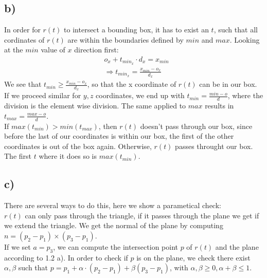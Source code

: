 \documentclass[a4paper]{scrartcl}
\begin{document}
    \subsection*{b)}
        In order for $r(t)$ to intersect a bounding box, it has to exist an $t$,
        such that all cordinates of $r(t)$ are within the boundaries defined by
        $min$ and $max$. Looking at the $min$ value of $x$ direction first:\\
        \begin{align*}
            & o_x + t_{min_x} \cdot d_x = x_{min}\\
            &\Rightarrow t_{min_x}=\frac{x_{min}-o_x }{d_x }
        \end{align*}
        We see that $t_{min}\geq\frac{x_{min}-o_x }{d_x }$, so that the x
        coordinate of $r(t)$ can be in our box. If we proceed similar for $y,z$
        coordinates, we end up with $t_{min}=\frac{min-o}{d}$, where the
        division is the element wise division. The same applied to $max$ results
        in $t_{max}=\frac{max-o}{d}$.\\
        If $max(t_{min}) > min(t_{max})$, then $r(t)$ doesn't pass through our
        box, since before the last of our coordinates is within our box, the
        first of the other coordinates is out of the box again. Otherwise,
        $r(t)$ passes throught our box. The first $t$ where it does so is
        $max(t_{min})$.
    \subsection*{c)}
        There are several ways to do this, here we show a parametical check:\\
        $r(t)$ can only pass through the triangle, if it passes through the
        plane we get if we extend the triangle. We get the normal of the plane
        by computing $n=(p_2 - p_1)\times (p_3 - p_1)$.\\
        If we set $a=p_3$, we can compute the intersection point $p$ of $r(t)$
        and the plane according to 1.2 a). In order to check if $p$ is on the
        plane, we check there exist $\alpha , \beta$ such that $p=p_1 + \alpha
        \cdot (p_2 - p_1 ) + \beta (p_3 - p_1 )$, with $\alpha , \beta \geq 0,
        \alpha + \beta \leq 1$.
\end{document}
